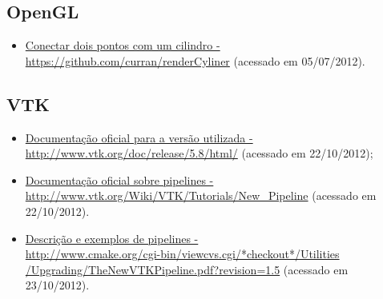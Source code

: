 \subsection{OpenGL}
\begin{itemize}
  \item \href{https://github.com/curran/renderCyliner}{Conectar dois pontos com um cilindro - https://github.com/curran/renderCyliner} (acessado em 05/07/2012).
\end{itemize}

\subsection{VTK}
\begin{itemize}
  \item \href{http://www.vtk.org/doc/release/5.8/html/}{Documentação oficial para a versão utilizada - \\http://www.vtk.org/doc/release/5.8/html/} (acessado em 22/10/2012);
  \item \href{http://www.vtk.org/Wiki/VTK/Tutorials/New\_Pipeline}{Documentação oficial sobre pipelines - \\http://www.vtk.org/Wiki/VTK/Tutorials/New\_Pipeline} (acessado em 22/10/2012).
  \item \href{http://www.cmake.org/cgi-bin/viewcvs.cgi/*checkout*/Utilities/Upgrading/TheNewVTKPipeline.pdf?revision=1.5}{Descrição e exemplos de pipelines - \\http://www.cmake.org/cgi-bin/viewcvs.cgi/*checkout*/Utilities\\/Upgrading/TheNewVTKPipeline.pdf?revision=1.5} (acessado em 23/10/2012).
\end{itemize}


